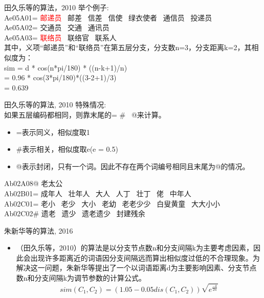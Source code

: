 \documentclass[aspectratio=169]{beamer} %
\begin{document}
    \begin{frame}{田久乐等的算法，2010}
    举个例子: \\
    Ae05A01= \textcolor{red}{邮递员} \ 邮差 \ 信差 \ 信使 \ 绿衣使者 \ 通信员 \ 投递员 \\
    Ae05A02= 交通员 \ 交通 \ 通讯员 \\
    Ae05A03= \textcolor{red}{联络员} \ 联络官 \ 联系人 \\
    其中，义项“邮递员”和“联络员”在第五层分支，分支数n=3，分支距离k=2，其相似度为：\\
    sim = d * cos(n*pi/180) * ((n-k+1)/n) \\
        = 0.96 * cos(3*pi/180)*((3-2+1)/3) \\
        = 0.639 \\

    \end{frame}

    \begin{frame}{田久乐等的算法, 2010}
    特殊情况: \\
    如果五层编码都相同，则靠末尾的= \# \ @来计算。\\
    \begin{itemize}
      \item =表示同义，相似度取1 \\
      \item \#表示相关，相似度取e(e = 0.5) \\
      \item @表示封闭，只有一个词。因此不存在两个词编号相同且末尾为@的情况。\\
    \end{itemize}

    Ab02A08@ 老太公 \\
    Ab02B01= 成年人 \ 壮年人 \ 大人 \ 人丁 \ 壮丁 \ 佬 \ 中年人 \\
    Ab02C01= 老小 \ 老少 \ 大小 \ 老幼 \ 老老少少 \ 白叟黄童 \ 大大小小 \\
    Ab02C02\# 遗老 \ 遗少 \ 遗老遗少 \ 封建残余 \\
    \end{frame}

    \begin{frame}{朱新华等的算法, 2016}
      \begin{itemize}
        \item （田久乐等，2010）的算法是以分支节点数n和分支间隔k为主要考虑因素，因此会出现许多距离近的词语因分支间隔远而算出相似度过低的不合理现象。为解决这一问题，朱新华等提出了一个以词语距离d为主要影响因素、分支节点数n和分支间隔k为调节参数的计算公式。
        $$
          sim(C_1, C_2) = (1.05 - 0.05dis(C_1, C_2)) \sqrt{e^{\frac{-k}{2n}}}
        $$
      \end{itemize}
    \end{frame}
\end{document}
